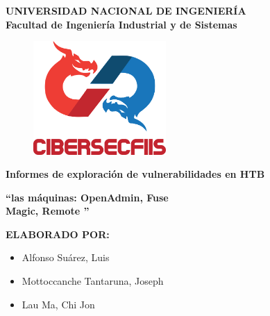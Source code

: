 \begin{titlepage}
	
	
	\begin{center}
		{\LARGE \textbf{UNIVERSIDAD NACIONAL DE INGENIERÍA}}\\
		\vspace{5 mm}
		{\large \textbf{Facultad de Ingeniería Industrial y de Sistemas}}\\
		\vspace{15.5 mm}
		\begin{figure}[h]
			\centering 
			\includegraphics[width=0.45\textwidth]{images/CiberSecFIIS.png}
		\end{figure}
		\vspace{4 mm}	
		{\Large \textbf{Informes de exploración de vulnerabilidades en HTB} }\\
		\vspace{5 mm}
		
		\onehalfspacing  %
		{\Large \textbf{``{\@De las máquinas: OpenAdmin, Fuse \\Magic, Remote }''} }\\
		
		\singlespacing  %
		
		\vspace{4 mm}	

		\vspace{20 mm}
		{\large \textbf{ELABORADO POR:} }\\
		\vspace{10 mm}
		\begin{center}
			\begin{minipage}{0.7\textwidth}
			  \begin{itemize}
				\item \Large Alfonso Suárez, Luis
				\item \Large Mottoccanche Tantaruna, Joseph
				\item \Large Lau Ma, Chi Jon
			  \end{itemize}
			\end{minipage}
		  \end{center}

		\vspace{5 mm}	
	\end{center}

\end{titlepage}
